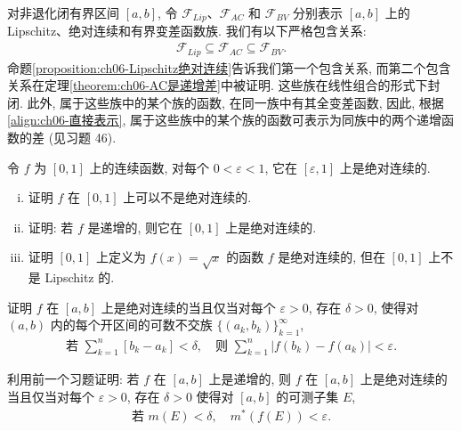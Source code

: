 \documentclass[../../main.tex]{subfiles}
\begin{document}
\begin{remark}\label{remark:ch06-函数族包含}
对非退化闭有界区间 $[a,b]$, 令 $\mathcal{F}_{Lip}$、$\mathcal{F}_{AC}$ 和 $\mathcal{F}_{BV}$ 分别表示 $[a,b]$ 上的 Lipschitz、绝对连续和有界变差函数族. 我们有以下严格包含关系:
\begin{align}
\mathcal{F}_{Lip}\subseteq\mathcal{F}_{AC}\subseteq\mathcal{F}_{BV}.\label{align:ch06-族包含}
\end{align}
命题\cref{proposition:ch06-Lipschitz绝对连续}告诉我们第一个包含关系, 而第二个包含关系在定理\cref{theorem:ch06-AC是递增差}中被证明. 这些族在线性组合的形式下封闭. 此外, 属于这些族中的某个族的函数, 在同一族中有其全变差函数, 因此, 根据\eqref{align:ch06-直接表示}, 属于这些族中的某个族的函数可表示为同族中的两个递增函数的差 (见习题 46).
\end{remark}

\begin{exercise}\label{exercise:ch06-37}
令 $f$ 为 $[0,1]$ 上的连续函数, 对每个 $0<\varepsilon<1$, 它在 $[\varepsilon,1]$ 上是绝对连续的.
\begin{enumerate}[(i)]
\item 证明 $f$ 在 $[0,1]$ 上可以不是绝对连续的.
\item 证明: 若 $f$ 是递增的, 则它在 $[0,1]$ 上是绝对连续的.
\item 证明 $[0,1]$ 上定义为 $f(x)=\sqrt{x}$ 的函数 $f$ 是绝对连续的, 但在 $[0,1]$ 上不是 Lipschitz 的.
\end{enumerate}
\end{exercise}

\begin{exercise}\label{exercise:ch06-38}
证明 $f$ 在 $[a,b]$ 上是绝对连续的当且仅当对每个 $\varepsilon>0$, 存在 $\delta>0$, 使得对 $(a,b)$ 内的每个开区间的可数不交族 $\{(a_{k},b_{k})\}_{k=1}^{\infty}$,
\begin{align*}
\text{若 }\sum_{k=1}^{n}[b_{k}-a_{k}]<\delta,\quad\text{则 }\sum_{k=1}^{n}|f(b_{k})-f(a_{k})|<\varepsilon.
\end{align*}
\end{exercise}

\begin{exercise}\label{exercise:ch06-39}
利用前一个习题证明: 若 $f$ 在 $[a,b]$ 上是递增的, 则 $f$ 在 $[a,b]$ 上是绝对连续的当且仅当对每个 $\varepsilon>0$, 存在 $\delta>0$ 使得对 $[a,b]$ 的可测子集 $E$,
\begin{align*}
\text{若 }m(E)<\delta,\quad m^{*}(f(E))<\varepsilon.
\end{align*}
\end{exercise}
\end{document}
